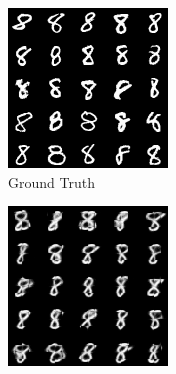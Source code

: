 \begin{figure}[H]
    \centering
    \begin{subfigure}[b]{0.24\textwidth}
        \centering
        \includegraphics[width=\textwidth]{figures/einsum/mnist/[8]_ground_truth.png}
        \caption{Ground Truth}
    \end{subfigure}
    \begin{subfigure}[b]{0.24\textwidth}
        \centering
        \includegraphics[width=\textwidth]{figures/einsum/mnist/[8]_EM.png}

\end{subfigure}
\end{figure}
